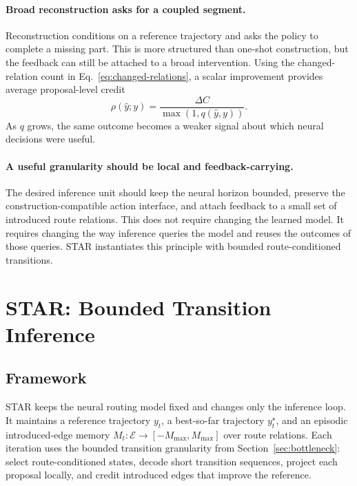 \documentclass[11pt]{article}
\newcommand{\method}{\textsc{STAR}}
\newcommand{\cE}{\mathcal{E}}
\begin{document}
\paragraph{Broad reconstruction asks for a coupled segment.}
Reconstruction conditions on a reference trajectory and asks the policy to complete a missing part. This is more structured than one-shot construction, but the feedback can still be attached to a broad intervention. Using the changed-relation count in Eq.~\eqref{eq:changed-relations}, a scalar improvement provides average proposal-level credit
\begin{equation}
  \rho(\hat y;y)=\frac{\Delta C}{\max(1,q(\hat y,y))}.
  \label{eq:credit-density}
\end{equation}
As $q$ grows, the same outcome becomes a weaker signal about which neural decisions were useful.

\paragraph{A useful granularity should be local and feedback-carrying.}
The desired inference unit should keep the neural horizon bounded, preserve the construction-compatible action interface, and attach feedback to a small set of introduced route relations. This does not require changing the learned model. It requires changing the way inference queries the model and reuses the outcomes of those queries. \method{} instantiates this principle with bounded route-conditioned transitions.

\section{\method{}: Bounded Transition Inference}
\label{sec:method}

\subsection{Framework}

\method{} keeps the neural routing model fixed and changes only the inference loop. It maintains a reference trajectory $y_t$, a best-so-far trajectory $y_t^\star$, and an episodic introduced-edge memory $M_t:\cE\rightarrow[-M_{\max},M_{\max}]$ over route relations. Each iteration uses the bounded transition granularity from Section~\ref{sec:bottleneck}: select route-conditioned states, decode short transition sequences, project each proposal locally, and credit introduced edges that improve the reference.
\end{document}
